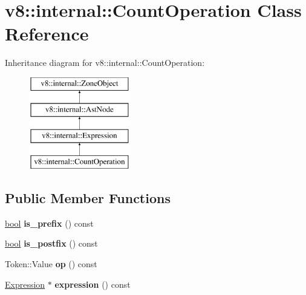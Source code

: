 \hypertarget{classv8_1_1internal_1_1CountOperation}{}\section{v8\+:\+:internal\+:\+:Count\+Operation Class Reference}
\label{classv8_1_1internal_1_1CountOperation}
Inheritance diagram for v8\+:\+:internal\+:\+:Count\+Operation\+:\begin{figure}[H]
\begin{center}
\leavevmode
\includegraphics[height=4.000000cm]{classv8_1_1internal_1_1CountOperation}
\end{center}
\end{figure}
\subsection*{Public Member Functions}
\begin{DoxyCompactItemize}
\item 
\mbox{\label{classv8_1_1internal_1_1CountOperation_a2db4db6f690a7968e3a0f60f25d66c82}} 
\mbox{\hyperlink{classbool}{bool}} {\bfseries is\+\_\+prefix} () const
\item 
\mbox{\label{classv8_1_1internal_1_1CountOperation_a36a5c267df687a211d814c19f180a1af}} 
\mbox{\hyperlink{classbool}{bool}} {\bfseries is\+\_\+postfix} () const
\item 
\mbox{\label{classv8_1_1internal_1_1CountOperation_a771304cfaa3fb9ec741998fb09a1b96c}} 
Token\+::\+Value {\bfseries op} () const
\item 
\mbox{\label{classv8_1_1internal_1_1CountOperation_a99f7c77d704643c071394a24ff47862e}} 
\mbox{\hyperlink{classv8_1_1internal_1_1Expression}{Expression}} $\ast$ {\bfseries expression} () const
\end{DoxyCompactItemize}
